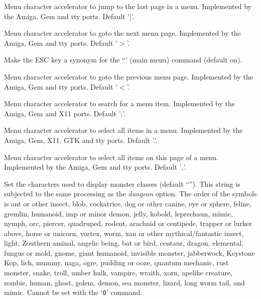 \item[\ib{menu\_last\_page}]
Menu character accelerator to jump to the last page in a menu.
Implemented by the Amiga, Gem and tty ports.
Default '|'.

\item[\ib{menu\_next\_page}]
Menu character accelerator to goto the next menu page.
Implemented by the Amiga, Gem and tty ports.
Default '$>$'.

\item[\ib{menu\_on\_esc}]
Make the ESC key a synonym for the ``{\tt }' (main menu) command (default on).

\item[\ib{menu\_previous\_page}]
Menu character accelerator to goto the previous menu page.
Implemented by the Amiga, Gem and tty ports.
Default '$<$'.

\item[\ib{menu\_search}]
Menu character accelerator to search for a menu item.
Implemented by the Amiga, Gem and X11 ports.
Default ':'.

\item[\ib{menu\_select\_all}]
Menu character accelerator to select all items in a menu.
Implemented by the Amiga, Gem, X11, GTK and tty ports.
Default '.'.

\item[\ib{menu\_select\_page}]
Menu character accelerator to select all items on this page of a menu.
Implemented by the Amiga, Gem and tty ports.
Default ','.

\item[\ib{monsters}]
Set the characters used to display monster classes (default
``\Symbol{abcdefghijklmnopqrstuvwxyzABCDEFGHIJKLMNOPQRSTUVWXYZ@\ \'{}\&;:\~{}]}'').
This string is subjected to the same processing as the
{\it dungeon\/} 
option.
The order of the symbols is
ant or other insect, blob, cockatrice,
dog or other canine, eye or sphere, feline,
gremlin, humanoid, imp or minor demon,
jelly, kobold, leprechaun,
mimic, nymph, orc,
piercer, quadruped, rodent,
arachnid or centipede, trapper or lurker above, horse or unicorn,
vortex, worm, xan or other mythical/fantastic insect,
light, Zouthern aminal,
angelic being, bat or bird, centaur,
dragon, elemental, fungus or mold,
gnome, giant humanoid, invisible monster,
jabberwock, Keystone Kop, lich,
mummy, naga, ogre,
pudding or ooze, quantum mechanic, rust monster,
snake, troll, umber hulk,
vampire, wraith, xorn,
apelike creature, zombie,
human, ghost, golem,
demon, sea monster, lizard,
long worm tail, and mimic.
Cannot be set with the `{\tt O}' command.


